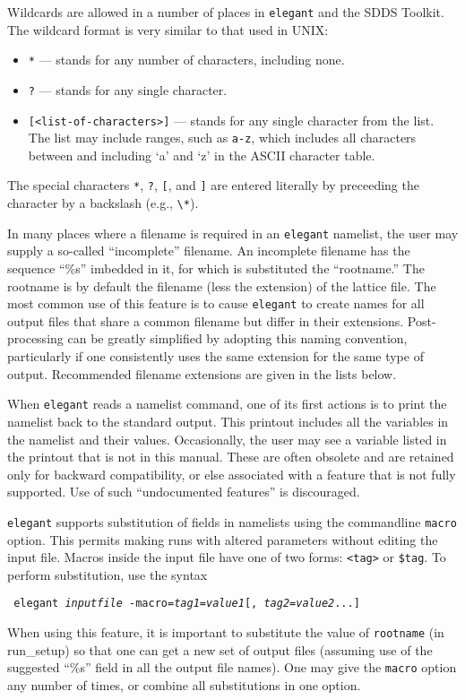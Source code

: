 \documentclass[11pt]{article}
\begin{document}
Wildcards are allowed in a number of places in {\tt elegant} and the SDDS Toolkit.  The wildcard format is
very similar to that used in UNIX:
\begin{itemize}
\item \verb|*| --- stands for any number of characters, including none.
\item \verb|?| --- stands for any single character.
\item \verb|[<list-of-characters>]| --- stands for any single character from the list.  The list may include
ranges, such as \verb|a-z|, which includes all characters between and including `a' and `z' in the ASCII
character table.
\end{itemize}
The special characters \verb|*|, \verb|?|, \verb|[|, and \verb|]| are entered literally by preceeding the character by a
backslash (e.g., \verb|\*|).

In many places where a filename is required in an {\tt elegant}
namelist, the user may supply a so-called ``incomplete'' filename.  An
incomplete filename has the sequence ``\%s'' imbedded in it, for which
is substituted the ``rootname.''  The rootname is by default the
filename (less the extension) of the lattice file.  The most common
use of this feature is to cause {\tt elegant} to create names for all
output files that share a common filename but differ in their
extensions.  Post-processing can be greatly simplified by adopting
this naming convention, particularly if one consistently uses the same
extension for the same type of output.  Recommended filename
extensions are given in the lists below.

When {\tt elegant} reads a namelist command, one of its first actions
is to print the namelist back to the standard output.  This printout
includes all the variables in the namelist and their values.
Occasionally, the user may see a variable listed in the printout that
is not in this manual.  These are often obsolete and are retained only
for backward compatibility, or else associated with a feature that is
not fully supported.  Use of such ``undocumented features'' is
discouraged.

{\tt elegant} supports substitution of fields in namelists using the
commandline {\tt macro} option.  This permits making runs with altered
parameters without editing the input file.  Macros inside the input
file have one of two forms: \verb|<tag>| or \verb|$tag|.  To perform
substitution, use the syntax
\begin{flushleft}{\tt
elegant {\em inputfile} -macro={\em tag1}={\em value1}[,{\em
tag2}={\em value2}...]  }\end{flushleft} When using this feature, it
is important to substitute the value of {\tt rootname} (in run\_setup)
so that one can get a new set of output files (assuming use of the
suggested ``\%s'' field in all the output file names).
One may give the {\tt macro} option any number of times, or combine
all substitutions in one option.
\end{document}
